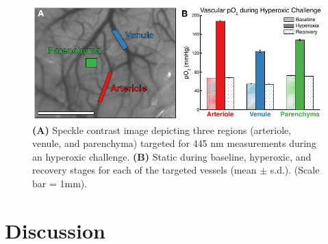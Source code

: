 \begin{figure}
    \includegraphics{figures/chapter_2/hyperoxicchallenge.pdf}
    \caption {
        \label{fig:hyperoxicchallenge}
        \textbf{(A)} Speckle contrast image depicting three regions (arteriole, venule, and parenchyma) targeted for 445 nm  measurements during an hyperoxic challenge. \textbf{(B)} Static  during baseline, hyperoxic, and recovery stages for each of the targeted vessels (mean $\pm$ s.d.). (Scale bar = 1mm).
    }
\end{figure}



\section{Discussion}

\blindtext



